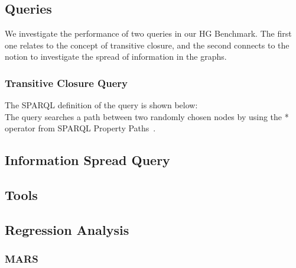 \subsection{Queries}

We investigate the performance of two queries in our HG Benchmark. The first one relates to the concept of transitive closure, and the second connects to the notion to investigate the spread of information in the graphs.

\subsubsection{Transitive Closure Query}

The SPARQL definition of the query is shown below:\\


The query searches a path between two randomly chosen nodes by using the \textsf{*} operator from SPARQL Property Paths~\cite{property_path}.

\subsection{Information Spread Query}


\subsection{Tools}

\subsection{Regression Analysis}

\subsubsection{MARS}


